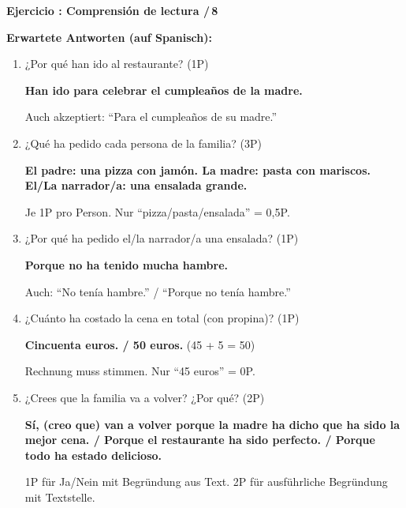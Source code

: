 \documentclass[a4paper,11pt]{article}
\newcommand{\lsg}[1]{{\color{loesung}\textbf{#1}}}
\newcommand{\punkte}[1]{\hfill\textcolor{mittelgrau}{\small /\,#1}}
\newcounter{aufgabe}
\newenvironment{aufgabe}[2]{%
    \refstepcounter{aufgabe}
    \vspace{4mm}
    \noindent\textbf{\color{spanisch}Ejercicio \theaufgabe: #1 \punkte{#2}}
    \vspace{1.5mm}
    \par
}{%
    \vspace{2mm}
}
\begin{document}
\begin{aufgabe}{Comprensión de lectura}{8}

\textbf{Erwartete Antworten (auf Spanisch):}

\vspace{3mm}

\begin{enumerate}[itemsep=4mm]
    \item ¿Por qué han ido al restaurante? (1P)

    \lsg{Han ido para celebrar el cumpleaños de la madre.}

    {\small\color{mittelgrau}Auch akzeptiert: ``Para el cumpleaños de su madre.''}

    \item ¿Qué ha pedido cada persona de la familia? (3P)

    \lsg{El padre: una pizza con jamón. La madre: pasta con mariscos. El/La narrador/a: una ensalada grande.}

    {\small\color{mittelgrau}Je 1P pro Person. Nur ``pizza/pasta/ensalada'' = 0,5P.}

    \item ¿Por qué ha pedido el/la narrador/a una ensalada? (1P)

    \lsg{Porque no ha tenido mucha hambre.}

    {\small\color{mittelgrau}Auch: ``No tenía hambre.'' / ``Porque no tenía hambre.''}

    \item ¿Cuánto ha costado la cena en total (con propina)? (1P)

    \lsg{Cincuenta euros. / 50 euros.} {\small(45 + 5 = 50)}

    {\small\color{mittelgrau}Rechnung muss stimmen. Nur ``45 euros'' = 0P.}

    \item ¿Crees que la familia va a volver? ¿Por qué? (2P)

    \lsg{Sí, (creo que) van a volver porque la madre ha dicho que ha sido la mejor cena. / Porque el restaurante ha sido perfecto. / Porque todo ha estado delicioso.}

    {\small\color{mittelgrau}1P für Ja/Nein mit Begründung aus Text. 2P für ausführliche Begründung mit Textstelle.}
\end{enumerate}

\end{aufgabe}

\newpage

\end{document}
